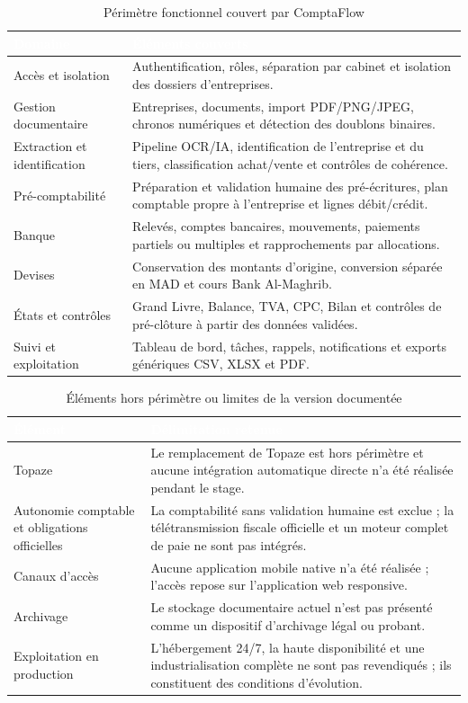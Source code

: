 \documentclass[12pt,a4paper,oneside]{report}
\newcommand{\TableSetup}{%
  \arrayrulecolor{ComptaTableLine}%
  \setlength{\arrayrulewidth}{0.45pt}%
  \renewcommand{\arraystretch}{1.18}%
}
\newcommand{\TableHead}[1]{\textcolor{white}{\textbf{#1}}}
\begin{document}
\begin{table}[H]
\centering
\caption{Périmètre fonctionnel couvert par ComptaFlow}
\footnotesize
\TableSetup
\begin{tabularx}{\textwidth}{|L{3.5cm}|Y|}
\toprule
{}\TableHead{Domaine} & \TableHead{Éléments couverts} \\
\midrule
Accès et isolation & Authentification, rôles, séparation par cabinet et isolation des dossiers d'entreprises. \\
Gestion documentaire & Entreprises, documents, import PDF/PNG/JPEG, chronos numériques et détection des doublons binaires. \\
Extraction et identification & Pipeline OCR/IA, identification de l'entreprise et du tiers, classification achat/vente et contrôles de cohérence. \\
Pré-comptabilité & Préparation et validation humaine des pré-écritures, plan comptable propre à l'entreprise et lignes débit/crédit. \\
Banque & Relevés, comptes bancaires, mouvements, paiements partiels ou multiples et rapprochements par allocations. \\
Devises & Conservation des montants d'origine, conversion séparée en MAD et cours Bank Al-Maghrib. \\
États et contrôles & Grand Livre, Balance, TVA, CPC, Bilan et contrôles de pré-clôture à partir des données validées. \\
Suivi et exploitation & Tableau de bord, tâches, rappels, notifications et exports génériques CSV, XLSX et PDF. \\
\bottomrule
\end{tabularx}
\end{table}

\begin{table}[H]
\centering
\caption{Éléments hors périmètre ou limites de la version documentée}
\footnotesize
\TableSetup
\begin{tabularx}{\textwidth}{|L{4.2cm}|Y|}
\toprule
{}\TableHead{Élément} & \TableHead{Délimitation retenue} \\
\midrule
Topaze & Le remplacement de Topaze est hors périmètre et aucune intégration automatique directe n'a été réalisée pendant le stage. \\
Autonomie comptable et obligations officielles & La comptabilité sans validation humaine est exclue ; la télétransmission fiscale officielle et un moteur complet de paie ne sont pas intégrés. \\
Canaux d'accès & Aucune application mobile native n'a été réalisée ; l'accès repose sur l'application web responsive. \\
Archivage & Le stockage documentaire actuel n'est pas présenté comme un dispositif d'archivage légal ou probant. \\
Exploitation en production & L'hébergement 24/7, la haute disponibilité et une industrialisation complète ne sont pas revendiqués ; ils constituent des conditions d'évolution. \\
\bottomrule
\end{tabularx}
\end{table}
\end{document}
